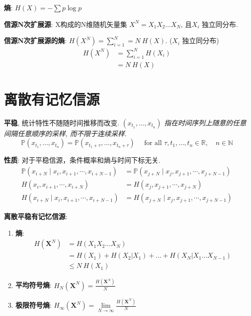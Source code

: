 \documentclass{article}
\newcommand{\env}[2]{\begin{#1}#2\end{#1}}
\newcommand{\defi}[2]{\textbf{#1}, #2}
\begin{document}
            
        \textbf{熵}: $H(X) = -\sum p \log p$
        
        \textbf{信源N次扩展源}: X构成的N维随机矢量集 $X^N = X_1 X_2...X_N$, 且$X_i$ 独立同分布.

        \textbf{信源N次扩展源的熵}: $H(X^N) = \sum_{i=1}^N = N\ H(X)$. ($X_i$ 独立同分布)
            \env{align*}{
                H(X^N) 
                &= \sum_{i=1}^N H(X_i)  \tag{$X_i$ 独立}\\
                &= N\ H(X)  \tag{$X_i$ 同分布}
            }
        
    \section{离散有记忆信源}
            
            \defi{平稳}{统计特性不随随时间推移而改变. \textit{$\left(x_{t_{1}}, \ldots, x_{t_{n}}\right)$ 指在时间序列上随意的任意间隔任意顺序的采样, 而不限于连续采样.}
                $$ \mathbb P\left(x_{t_{1}}, \ldots, x_{t_{n}}\right) = \mathbb P\left(x_{t_{1}+\tau}, \ldots, x_{t_{n}+\tau}\right) \quad \text { for all } \tau, t_{1}, \ldots, t_{n} \in \mathbb{R}, \quad n \in \mathbb{N}$$
            }
                
                \textbf{性质}: 
                    对于平稳信源，条件概率和熵与时间下标无关.
                        \env{align*}{
                            \mathbb P\left(x_{i+N} \mid x_{i}, x_{i+1}, \cdots, x_{i+N-1}\right) &= \mathbb P\left(x_{j+N} \mid x_{j}, x_{j+1}, \cdots, x_{j+N-1}\right) \tag{条件概率}\\
                            H\left(x_{i}, x_{i+1}, \cdots, x_{i+N}\right) &= H\left(x_{j}, x_{j+1}, \cdots, x_{j+N}\right) \tag{熵}\\
                            H\left(x_{i+N} \mid x_{i}, x_{i+1}, \cdots, x_{i+N-1}\right) &= H\left(x_{j+N} \mid x_{j}, x_{j+1}, \cdots, x_{j+N-1}\right) \tag{条件熵}
                        }
                        
            \textbf{离散平稳有记忆信源}:
                \env{enumerate}{
                \item \textbf{熵}:
                    \env{align*}{
                        H(\boldsymbol X^N) 
                        &= H(X_1 X_2 ... X_N) \tag{定义}\\
                        &= H(X_1) + H(X_2|X_1) + ... + H(X_N | X_1 ... X_{N-1}) \tag{条件熵展开}\\
                        &\le N\ H(X_1) \tag{熵的不增原理}
                    }
                \item \textbf{平均符号熵}: $H_N(\boldsymbol X^N) = \frac{H(\boldsymbol X^N)}{N}$
                \item \textbf{极限符号熵}: $H_\infty(\boldsymbol X^N) = \lim\limits_{N \to \infty} \frac{H(\boldsymbol X^N)}{N}$
                }
                
\end{document}
